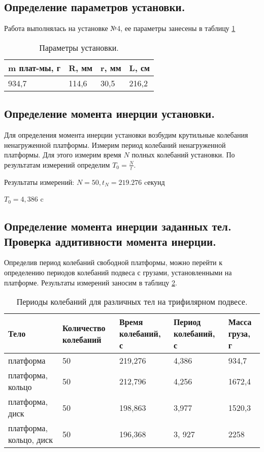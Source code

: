 \documentclass[12pt,a4paper]{article}
\begin{document}
	\subsection{Определение параметров установки.}
	
		Работа выполнялась на установке №4, ее параметры занесены в таблицу \ref{tab:parametrs}
		\begin{table}[h!]
			\begin{center}
			\begin{tabular}{| l | l | l | l |}
					\hline
					m плат-мы, г & R, мм & r, мм & L, см \\ \hline
					934,7 & 114,6 & 30,5 & 216,2 \\
					\hline
				\end{tabular}
			\end{center} 
			\caption{Параметры установки.}
			\label{tab:parametrs}
		\end{table}
				
	\subsection{Определение момента инерции установки.}
	
		\qquad Для определения момента инерции установки возбудим крутильные колебания ненагруженной платформы. Измерим период колебаний ненагруженной платформы. Для этого измерим время $N$ полных колебаний установки. По результатам измерений определим $ T_{0} = \frac{N}{t}$.
		
		Результаты измерений: $ N = 50, t_{N} = 219.276$ cекунд
		
		 $T_{0} = 4,386$ c 
	\subsection{Определение момента инерции заданных тел. Проверка аддитивности момента инерции.}
	
		Определив период колебаний свободной платформы, можно перейти к определению периодов колебаний подвеса с грузами, установленными на платформе. Результаты измерений заносим в таблицу \ref{tab:periods_diff_body}.
		
		\begin{table}[ht!]
			\begin{center}
			\begin{tabular}{| p{65pt} | p{65pt} | p{55pt} | p{60pt}  | p{60pt} |}
					\hline
					Тело & Количество колебаний & Время колебаний, с & Период колебаний, с & Масса груза, г \\ \hline
					платформа & 50 & 219,276 & 4,386 & 934,7 \\ \hline
					платформа, кольцо & 50 & 212,796 & 4,256 & 1672,4 \\ \hline
					платформа, диск & 50 & 198,863 & 3,977 & 1520,3 \\ \hline
					платформа, кольцо, диск & 50 & 196,368 & 3, 927 & 2258 \\
					\hline
				\end{tabular}
			\end{center} 
			\caption{Периоды колебаний для различных тел на трифилярном подвесе.}
			\label{tab:periods_diff_body}
		\end{table}
		
\end{document}
